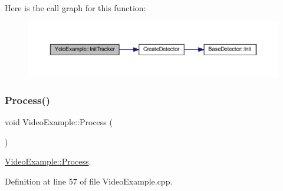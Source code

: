 Here is the call graph for this function\+:\nopagebreak
\begin{figure}[H]
\begin{center}
\leavevmode
\includegraphics[width=350pt]{class_yolo_example_a60980995a54b8bcfcf94bd4e04d0eeaa_cgraph}
\end{center}
\end{figure}
\mbox{\label{class_video_example_a87efc66a82c36ad3380623d30a12abf2}} 
\subsubsection{\texorpdfstring{Process()}{Process()}}
{\footnotesize\ttfamily void Video\+Example\+::\+Process (\begin{DoxyParamCaption}{ }\end{DoxyParamCaption})\hspace{0.3cm}{\ttfamily [inherited]}}



\mbox{\hyperlink{class_video_example_a87efc66a82c36ad3380623d30a12abf2}{Video\+Example\+::\+Process}}. 



Definition at line 57 of file Video\+Example.\+cpp.


